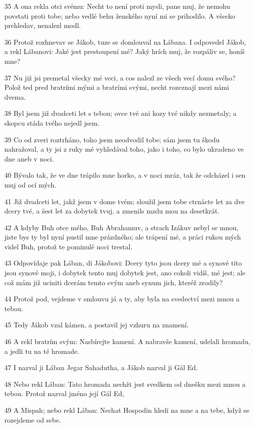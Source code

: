 \par 35 A ona rekla otci svému: Necht to není proti mysli, pane muj, že nemohu povstati proti tobe; nebo vedlé behu ženského nyní mi se prihodilo. A všecko prehledav, nenalezl modl.
\par 36 Protož rozhnevav se Jákob, tuze se domlouval na Lábana. I odpovedel Jákob, a rekl Lábanovi: Jaké jest prestoupení mé? Jaký hrích muj, že rozpáliv se, honíš mne?
\par 37 Nu již jsi premetal všecky mé veci, a cos nalezl ze všech vecí domu svého? Polož ted pred bratrími mými a bratrími svými, necht rozeznají mezi námi dvema.
\par 38 Byl jsem již dvadceti let s tebou; ovce tvé ani kozy tvé nikdy nezmetaly; a skopcu stáda tvého nejedl jsem.
\par 39 Co od zveri roztrháno, toho jsem neodvodil tobe; sám jsem tu škodu nahražoval, a ty jsi z ruky mé vyhledával toho, jako i toho, co bylo ukradeno ve dne aneb v noci.
\par 40 Bývalo tak, že ve dne trápilo mne horko, a v noci mráz, tak že odcházel i sen muj od ocí mých.
\par 41 Již dvadceti let, jakž jsem v dome tvém; sloužil jsem tobe ctrnácte let za dve dcery tvé, a šest let za dobytek tvuj, a zmenils mzdu mou na desetkrát.
\par 42 A kdyby Buh otce mého, Buh Abrahamuv, a strach Izákuv nebyl se mnou, jiste bys ty byl nyní pustil mne prázdného; ale trápení mé, a práci rukou mých videl Buh, protož te pominulé noci trestal.
\par 43 Odpovídaje pak Lában, dí Jákobovi: Dcery tyto jsou dcery mé a synové tito jsou synové moji, i dobytek tento muj dobytek jest, ano cokoli vidíš, mé jest; ale což mám již uciniti dcerám temto svým aneb synum jich, kteréž zrodily?
\par 44 Protož pod, vejdeme v smlouvu já a ty, aby byla na svedectví mezi mnou a tebou.
\par 45 Tedy Jákob vzal kámen, a postavil jej vzhuru na znamení.
\par 46 A rekl bratrím svým: Nasbírejte kamení. A nabravše kamení, udelali hromadu, a jedli tu na té hromade.
\par 47 I nazval ji Lában Jegar Sahadutha, a Jákob nazval ji Gál Ed.
\par 48 Nebo rekl Lában: Tato hromada nechžt jest svedkem od dnešku mezi mnou a tebou. Protož nazval jméno její Gál Ed,
\par 49 A Mispah; nebo rekl Lában: Nechat Hospodin hledí na mne a na tebe, když se rozejdeme od sebe.
